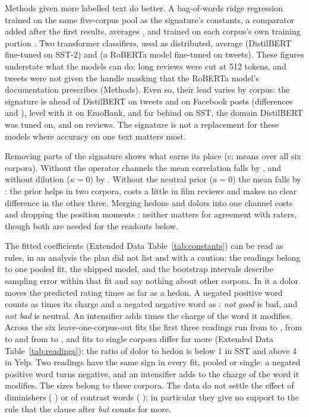 Methods given more labelled text do better. A bag-of-words ridge regression trained on the same five-corpus pool as the signature's constants, a comparator added after the first results, averages \meanBowPool, and trained on each corpus's own training portion \meanTfidf. Two transformer classifiers, used as distributed, average \meanDistil{} (DistilBERT fine-tuned on SST-2\cite{sanh2019}) and \meanRoberta{} (a RoBERTa model fine-tuned on tweets\cite{loureiro2022}). These figures understate what the models can do: long reviews were cut at 512 tokens, and tweets were not given the handle masking that the RoBERTa model's documentation prescribes (Methods). Even so, their lead varies by corpus: the signature is ahead of DistilBERT on tweets and on Facebook posts (differences \dDistilTw{} and \dDistilFb), level with it on EmoBank, and far behind on SST, the domain DistilBERT was tuned on, and on reviews. The signature is not a replacement for these models where accuracy on one text matters most.

Removing parts of the signature shows what earns its place (c; means over all six corpora). Without the operator channels the mean correlation falls by \lossNoShift, and without dilution ($\kappa=0$) by \lossNoDil. Without the neutral prior ($a=0$) the mean falls by \lossNoShrink: the prior helps in two corpora, costs a little in film reviews and makes no clear difference in the other three. Merging hedons and dolors into one channel costs \lossOneChan{} and dropping the position moments \lossNoPos: neither matters for agreement with raters, though both are needed for the readouts below.

The fitted coefficients (Extended Data Table~\ref{tab:constants}) can be read as rules, in an analysis the plan did not list and with a caution: the readings belong to one pooled fit, the shipped model, and the bootstrap intervals describe sampling error within that fit and say nothing about other corpora. In it a dolor moves the predicted rating \constDolor{} \constDolorCI{} times as far as a hedon. A negated positive word counts as \constNegH{} \constNegHCI{} times its charge and a negated negative word as \constNegD{} \constNegDCI: \emph{not good} is bad, and \emph{not bad} is neutral. An intensifier adds \constBoost{} \constBoostCI{} times the charge of the word it modifies. Across the six leave-one-corpus-out fits the first three readings run from \locoDolorLo{} to \locoDolorHi, from \locoNegHLo{} to \locoNegHHi{} and from \locoNegDLo{} to \locoNegDHi, and fits to single corpora differ far more (Extended Data Table~\ref{tab:readings}): the ratio of dolor to hedon is below 1 in SST and above 4 in Yelp. Two readings have the same sign in every fit, pooled or single: a negated positive word turns negative, and an intensifier adds to the charge of the word it modifies. The sizes belong to these corpora. The data do not settle the effect of diminishers (\constDamp{} \constDampCI) or of contrast words (\constPost{} \constPostCI); in particular they give no support to the rule that the clause after \emph{but} counts for more\cite{hutto2014}.


